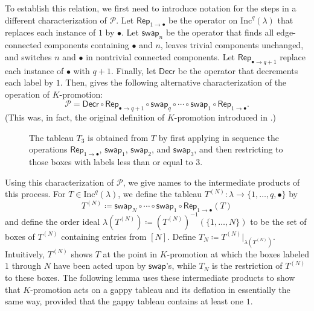 \documentclass[12pt]{amsart}
\theoremstyle{definition}
\theoremstyle{remark}
\numberwithin{equation}{section}
\newcommand{\inc}{\ensuremath{\mathrm{Inc}}}
\newcommand{\pro}{\mathcal{P}}
\newcommand{\swap}{\ensuremath{\mathsf{swap}}}
\newcommand{\decr}{\ensuremath{\mathsf{Decr}}}
\newcommand{\rep}{\ensuremath{\mathsf{Rep}}}
\begin{document}
To establish this relation, we first need to introduce notation for the steps in a different characterization of $\pro$. Let $\rep_{1 \rightarrow \bullet}$ be the operator on $\inc^q(\lambda)$ that replaces each instance of $1$ by $\bullet$. Let $\swap_n$ be the operator that finds all edge-connected components containing $\bullet$ and $n$, leaves trivial components unchanged, and switches $n$ and $\bullet$ in nontrivial connected components. Let $\rep_{\bullet \rightarrow q+1}$ replace each instance of $\bullet$ with $q+1$. Finally, let $\decr$ be the operator that decrements each label by $1$. Then, \cite[Proposition~2.4]{DPS} gives the following alternative characterization of the operation of $K$-promotion: \[\pro = \decr \circ \rep_{\bullet \rightarrow q+1} \circ \swap_q \circ \cdots \circ \swap_1 \circ \rep_{1 \rightarrow \bullet}.\] (This was, in fact, the original definition of $K$-promotion introduced in \cite{Pechenik}.)

\begin{figure}
\caption{The tableau $T_3$ is obtained from $T$ by first applying in sequence the operations $\rep_{1 \rightarrow \bullet}$, $\swap_1$, $\swap_2$, and $\swap_3$, and then restricting to those boxes with labels less than or equal to $3$.}
\end{figure}

Using this characterization of $\pro$, we give names to the intermediate products of this process.
For $T \in \inc^q(\lambda)$, we define the tableau $T^{(N)}: \lambda \rightarrow \lbrace 1, \dots, q, \bullet \rbrace$ by 
\[T^{(N)} \coloneqq \swap_N \circ \cdots \circ \swap_1 \circ \rep_{1 \rightarrow \bullet}(T)\] and define the order ideal $\lambda(T^{(N)}) \coloneqq \left( T^{(N)} \right)^{-1}(\{1,\dots,N\})$ to be the set of boxes of $T^{(N)}$ containing entries from $[N]$. Define $T_N \coloneqq T^{(N)} \vert_{\lambda(T^{(N)})}$. Intuitively, $T^{(N)}$ shows $T$ at the point in $K$-promotion at which the boxes labeled $1$ through $N$ have been acted upon by $\swap$'s, while $T_N$ is the restriction of $T^{(N)}$ to these boxes. The following lemma uses these intermediate products to show that $K$-promotion acts on a gappy tableau and its deflation in essentially the same way, provided that the gappy tableau contains at least one $1$. 
\end{document}
